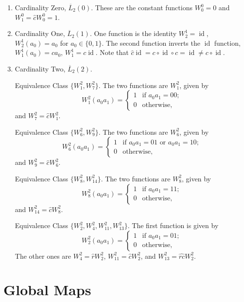 \documentclass[a4paper]{article}
\newcommand{\id}{\mathop{\mathrm{id}}}
\begin{document}
\begin{enumerate}

\item Cardinality Zero, $\overline{L}_2(0)$.
These are the constant functions $W^0_0 = 0$ and $W^0_1 = \hat{c} W^0_0 = 1$.

\item Cardinality One, $\overline{L}_2(1)$.
One function is the identity $W^1_2 = \id$, $W^1_2(a_0) = a_0$ for $a_0 \in \{0,1\}$.
The second function inverts the $\id$ function, $W^1_1(a_0) = ca_0$, $W^1_1 = c \id$.
Note that $\hat{c} \id = c \circ \id \circ c = \id \ne c \circ \id$.

\item Cardinality Two, $\overline{L}_2(2)$.

Equivalence Class $\{W^2_1, W^2_7\}$.
The two functions are $W^2_1$, given by
\[
W^2_1(a_0a_1) =
\left\{
\begin{array}{ll}
1 & \mbox{if $a_0a_1 = 00$;} \\
0 & \mbox{otherwise,}
\end{array}
\right.
\]
and $W^2_{7} = \hat{c}W^2_1$.

Equivalence Class $\{W^2_6, W^2_9\}$.
The two functions are
$W^2_6$, given by
\[
W^2_6(a_0a_1) =
\left\{
\begin{array}{ll}
1 & \mbox{if $a_0a_1 = 01$ or $a_0a_1 = 10$;} \\
0 & \mbox{otherwise,}
\end{array}
\right.
\]
and $W^2_9 = \hat{c}W^2_6$.

Equivalence Class $\{W^2_8, W^2_{14}\}$.
The two functions are
$W^2_8$, given by
\[
W^2_8(a_0a_1) =
\left\{
\begin{array}{ll}
1 & \mbox{if $a_0a_1 = 11$;} \\
0 & \mbox{otherwise,}
\end{array}
\right.
\]
and $W^2_{14} = \hat{c}W^2_8$.

Equivalence Class
$\{W^2_2,W^2_4,W^2_{11},W^2_{13}\}$.
The first function is given by
\[
W^2_2(a_0a_1) =
\left\{
\begin{array}{ll}
1 & \mbox{if $a_0a_1 = 01$;} \\
0 & \mbox{otherwise,}
\end{array}
\right.
\]
The other ones are $W^2_4 = \hat{r}W^2_2$, $W^2_{11} = \hat{c}W^2_2$, and
$W^2_{13} = \widehat{rc} W^2_2$.


\end{enumerate}

\section{Global Maps}
\label{sec:glob}
\end{document}
